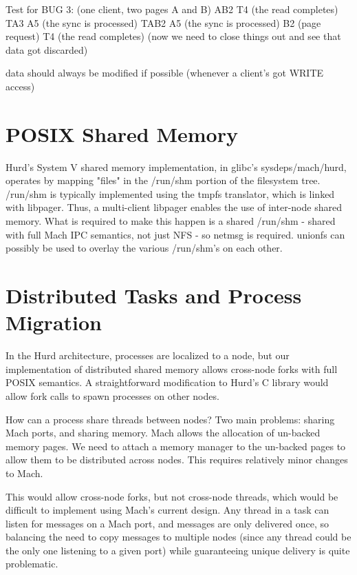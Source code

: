 \documentclass{article}
\begin{document}
Test for BUG 3: (one client, two pages A and B)
  AB2 T4 (the read completes) TA3 A5 (the sync is processed) TAB2 A5 (the sync is processed)
    B2 (page request) T4 (the read completes)
    (now we need to close things out and see that data got discarded)

data should always be modified if possible (whenever a client's got WRITE access)



\section{POSIX Shared Memory}

Hurd's System V shared memory implementation, in glibc's
sysdeps/mach/hurd, operates by mapping "files" in the /run/shm portion
of the filesystem tree.  /run/shm is typically implemented using the
tmpfs translator, which is linked with libpager.  Thus, a multi-client
libpager enables the use of inter-node shared memory.  What is
required to make this happen is a shared /run/shm - shared with full
Mach IPC semantics, not just NFS - so netmsg is required.  unionfs can
possibly be used to overlay the various /run/shm's on each other.


\section{Distributed Tasks and Process Migration}

In the Hurd architecture, processes are localized to a node, but our
implementation of distributed shared memory allows cross-node forks
with full POSIX semantics.  A straightforward modification to
Hurd's C library would allow fork calls to spawn processes
on other nodes.

How can a process share threads between nodes?  Two main problems:
sharing Mach ports, and sharing memory.  Mach allows the allocation
of un-backed memory pages.  We need to attach a memory manager
to the un-backed pages to allow them to be distributed across nodes.
This requires relatively minor changes to Mach.

This would allow cross-node forks, but not cross-node threads, which
would be difficult to implement using Mach's current design.  Any
thread in a task can listen for messages on a Mach port, and messages
are only delivered once, so balancing the need to copy messages to
multiple nodes (since any thread could be the only one listening to a
given port) while guaranteeing unique delivery is quite problematic.
\end{document}
